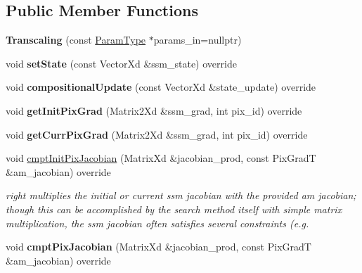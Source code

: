\subsection*{Public Member Functions}
\begin{DoxyCompactItemize}
\item 
\hypertarget{classTranscaling_a35deea371353d299f95fa59b7d14e862}{{\bfseries Transcaling} (const \hyperlink{structTranscalingParams}{Param\-Type} $\ast$params\-\_\-in=nullptr)}\label{classTranscaling_a35deea371353d299f95fa59b7d14e862}

\item 
\hypertarget{classTranscaling_a7e2d827defd43d6c37b05ab2e88a3b8d}{void {\bfseries set\-State} (const Vector\-Xd \&ssm\-\_\-state) override}\label{classTranscaling_a7e2d827defd43d6c37b05ab2e88a3b8d}

\item 
\hypertarget{classTranscaling_a872d5763d0c069d8d434d83a52ff6188}{void {\bfseries compositional\-Update} (const Vector\-Xd \&state\-\_\-update) override}\label{classTranscaling_a872d5763d0c069d8d434d83a52ff6188}

\item 
\hypertarget{classTranscaling_afff0ed2552cfeb2fb3b9db7dbd12b0d7}{void {\bfseries get\-Init\-Pix\-Grad} (Matrix2\-Xd \&ssm\-\_\-grad, int pix\-\_\-id) override}\label{classTranscaling_afff0ed2552cfeb2fb3b9db7dbd12b0d7}

\item 
\hypertarget{classTranscaling_a9f4de1be4f7fef9789d366f31c7c1d60}{void {\bfseries get\-Curr\-Pix\-Grad} (Matrix2\-Xd \&ssm\-\_\-grad, int pix\-\_\-id) override}\label{classTranscaling_a9f4de1be4f7fef9789d366f31c7c1d60}

\item 
void \hyperlink{classTranscaling_ab349cd5b1915285f96ec447046540a44}{cmpt\-Init\-Pix\-Jacobian} (Matrix\-Xd \&jacobian\-\_\-prod, const Pix\-Grad\-T \&am\-\_\-jacobian) override
\begin{DoxyCompactList}\small\item\em right multiplies the initial or current ssm jacobian with the provided am jacobian; though this can be accomplished by the search method itself with simple matrix multiplication, the ssm jacobian often satisfies several constraints (e.\-g. \end{DoxyCompactList}\item 
\hypertarget{classTranscaling_a2e1f4f4790ce426f3667f8ecfe43c8bc}{void {\bfseries cmpt\-Pix\-Jacobian} (Matrix\-Xd \&jacobian\-\_\-prod, const Pix\-Grad\-T \&am\-\_\-jacobian) override}\label{classTranscaling_a2e1f4f4790ce426f3667f8ecfe43c8bc}


\end{DoxyCompactItemize}
